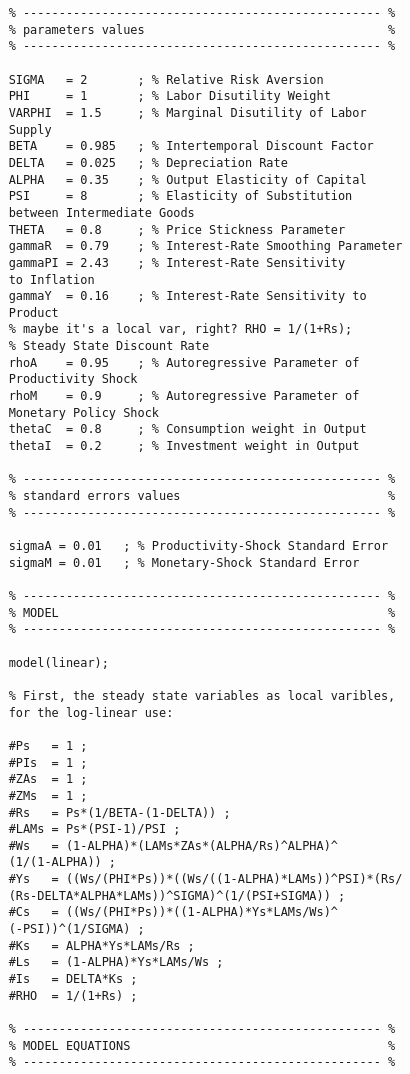\documentclass[
thesis.tex
]{subfiles}
\begin{document}
\begin{verbatim}
	% -------------------------------------------------- %
	% parameters values                                  %
	% -------------------------------------------------- % 
	
	SIGMA   = 2       ; % Relative Risk Aversion
	PHI     = 1       ; % Labor Disutility Weight
	VARPHI  = 1.5     ; % Marginal Disutility of Labor 
	Supply
	BETA    = 0.985   ; % Intertemporal Discount Factor
	DELTA   = 0.025   ; % Depreciation Rate
	ALPHA   = 0.35    ; % Output Elasticity of Capital
	PSI     = 8       ; % Elasticity of Substitution 
	between Intermediate Goods
	THETA   = 0.8     ; % Price Stickness Parameter
	gammaR  = 0.79    ; % Interest-Rate Smoothing Parameter
	gammaPI = 2.43    ; % Interest-Rate Sensitivity 
	to Inflation
	gammaY  = 0.16    ; % Interest-Rate Sensitivity to 
	Product
	% maybe it's a local var, right? RHO = 1/(1+Rs); 
	% Steady State Discount Rate
	rhoA    = 0.95    ; % Autoregressive Parameter of 
	Productivity Shock
	rhoM    = 0.9     ; % Autoregressive Parameter of 
	Monetary Policy Shock
	thetaC  = 0.8     ; % Consumption weight in Output
	thetaI  = 0.2     ; % Investment weight in Output
	
	% -------------------------------------------------- % 
	% standard errors values                             %
	% -------------------------------------------------- %
	
	sigmaA = 0.01   ; % Productivity-Shock Standard Error
	sigmaM = 0.01   ; % Monetary-Shock Standard Error
	
	% -------------------------------------------------- %
	% MODEL                                              %
	% -------------------------------------------------- %
	
	model(linear);
	
	% First, the steady state variables as local varibles, 
	for the log-linear use:
	
	#Ps   = 1 ;
	#PIs  = 1 ;
	#ZAs  = 1 ;
	#ZMs  = 1 ;
	#Rs   = Ps*(1/BETA-(1-DELTA)) ;
	#LAMs = Ps*(PSI-1)/PSI ;
	#Ws   = (1-ALPHA)*(LAMs*ZAs*(ALPHA/Rs)^ALPHA)^
	(1/(1-ALPHA)) ;
	#Ys   = ((Ws/(PHI*Ps))*((Ws/((1-ALPHA)*LAMs))^PSI)*(Rs/
	(Rs-DELTA*ALPHA*LAMs))^SIGMA)^(1/(PSI+SIGMA)) ;
	#Cs   = ((Ws/(PHI*Ps))*((1-ALPHA)*Ys*LAMs/Ws)^
	(-PSI))^(1/SIGMA) ;
	#Ks   = ALPHA*Ys*LAMs/Rs ;
	#Ls   = (1-ALPHA)*Ys*LAMs/Ws ;
	#Is   = DELTA*Ks ;
	#RHO  = 1/(1+Rs) ;
	
	% -------------------------------------------------- % 
	% MODEL EQUATIONS                                    %
	% -------------------------------------------------- %
	

\end{verbatim}
\end{document}
